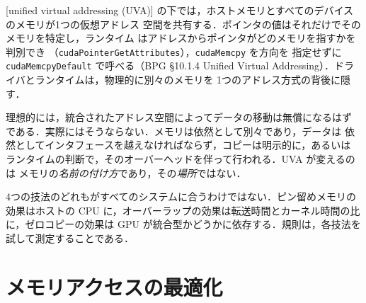 \documentclass[../main.tex]{subfiles}
\begin{document}
\begin{definition}[統合仮想アドレッシング]
  [unified virtual addressing (UVA)]
  の下では，ホストメモリとすべてのデバイスのメモリが1つの仮想アドレス
  空間を共有する．ポインタの値はそれだけでそのメモリを特定し，ランタイム
  はアドレスからポインタがどのメモリを指すかを判別でき
  （\texttt{cudaPointerGetAttributes}），\texttt{cudaMemcpy} を方向を
  指定せずに \texttt{cudaMemcpyDefault} で呼べる（BPG §10.1.4 Unified
  Virtual Addressing）．ドライバとランタイムは，物理的に別々のメモリを
  1つのアドレス方式の背後に隠す．
\end{definition}

理想的には，統合されたアドレス空間によってデータの移動は無償になるはず
である．実際にはそうならない．メモリは依然として別々であり，データは
依然としてインタフェースを越えなければならず，コピーは明示的に，あるいは
ランタイムの判断で，そのオーバーヘッドを伴って行われる．UVA が変えるのは
メモリの\emph{名前の付け方}であり，その\emph{場所}ではない．

4つの技法のどれもがすべてのシステムに合うわけではない．ピン留めメモリの
効果はホストの CPU に，オーバーラップの効果は転送時間とカーネル時間の比
に，ゼロコピーの効果は GPU が統合型かどうかに依存する．規則は，各技法を
試して測定することである．

\section{メモリアクセスの最適化}
\label{sec:l05-memory}
\end{document}
